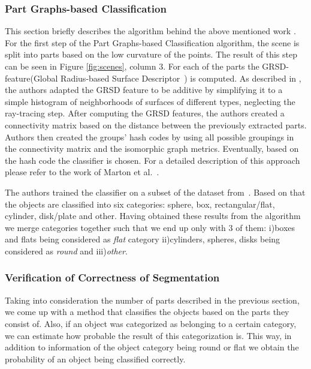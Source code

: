 
\subsubsection{Part Graphs-based Classification}
\label{sec:part-graphs}

This section briefly describes the algorithm behind the above mentioned work \cite{marton12SC}.
For the first step of the Part Graphs-based Classification algorithm, the scene is split into parts based on the low curvature of the points. The result of this step can be seen in Figure \ref{fig:scenes}, column 3. For each of the parts the GRSD- feature(Global Radius-based Surface Descriptor~\cite{irosws11vosch}) is computed. 
 As described in \cite{irosws11vosch}, the authors adapted the GRSD feature to be additive by simplifying it to a simple histogram of neighborhoods of surfaces of different types, neglecting the ray-tracing step. After computing the GRSD features, the authors created a connectivity matrix based on the distance between the previously extracted parts. Authors then created the groups' hash codes by using all possible groupings in the connectivity matrix and the isomorphic graph metrics. Eventually, based on the hash code the classifier is chosen. For a detailed description of this approach 
please refer to the work of Marton et al.~\cite{marton12SC}.
 
The authors trained the classifier on a subset of the dataset from~\cite{lai11db}. Based on that the objects are classified into six categories:  sphere, box, rectangular/flat, cylinder, disk/plate and other.
Having obtained these results from the algorithm we merge categories together such that we end up only with 3 of them: i)boxes and flats being considered as \emph{flat} category ii)cylinders, spheres, disks being considered as \emph{round} and iii)\emph{other}. 


\subsubsection{Verification of Correctness of Segmentation}
\label{sec:probabilities}

Taking into consideration the number of parts described in the previous section, we come up with a method that classifies the objects based on the parts they consist of. Also, if an object was categorized as belonging to a certain category, we can estimate how probable the result of this categorization is. This way, in addition to information of the object category being round or flat we obtain the probability of an object being classified correctly.

